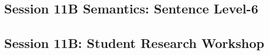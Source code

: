 \subsection{\large Session 11B Semantics: Sentence Level-6}
\label{parallel-session-11B-trackH}
\TrackHLoc\hfill\sessionchair{}{}
\clearpage
\subsection{\large Session 11B: Student Research Workshop}
\label{parallel-session-11B-trackI}
\TrackILoc\hfill\sessionchair{}{}
\clearpage



